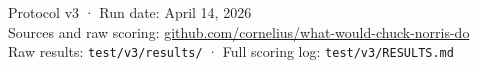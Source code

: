 \documentclass[10.5pt,a4paper]{article}
\begin{document}
\bigskip
\begin{center}

\medskip
{\small\color{dimgray}\lightfont
Protocol v3 · Run date: April 14, 2026 \\
Sources and raw scoring: \href{https://github.com/cornelius/what-would-chuck-norris-do}{github.com/cornelius/what-would-chuck-norris-do} \\
Raw results: \texttt{test/v3/results/} · Full scoring log: \texttt{test/v3/RESULTS.md}
}
\end{center}
\end{document}
